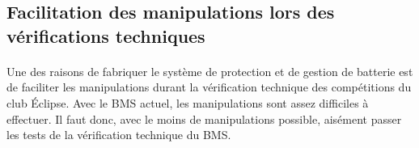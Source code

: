 	\subsection{Facilitation des manipulations lors des vérifications techniques}

		\paragraph{}
		Une des raisons de fabriquer le système de protection et de gestion de batterie est de faciliter les manipulations durant la vérification technique des compétitions du club Éclipse. Avec le BMS actuel, les manipulations sont assez difficiles à effectuer. Il faut donc, avec le moins de manipulations possible, aisément passer les tests de la vérification technique du BMS.

